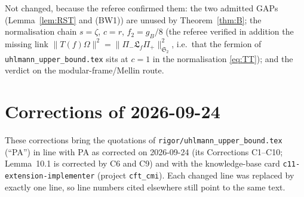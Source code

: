 \documentclass[11pt]{article}
\newcommand{\Om}{\Omega}
\newcommand{\norm}[1]{\lVert#1\rVert}
\newcommand{\gB}{g_B}
\newcommand{\Stwo}{\mathfrak S_2}
\begin{document}
Not changed, because the referee confirmed them: the two admitted GAPs (Lemma~\ref{lem:RST} and (BW1)) are
unused by Theorem~\ref{thm:B}; the normalisation chain $s=\zeta$, $c=r$, $f_2=\gB/8$ (the referee verified
in addition the missing link $\norm{T(f)\Om}^2=\norm{\Pi_-\mathfrak L_f\Pi_+}_{\Stwo}^2$, i.e.\ that the
fermion of \texttt{uhlmann\_upper\_bound.tex} sits at $c=1$ in the normalisation \eqref{eq:TT}); and the
verdict on the modular-frame/Mellin route.

\section{Corrections of 2026-09-24}\label{corr0924:sec}
\sloppy
These corrections bring the quotations of \texttt{rigor/uhlmann\_upper\_bound.tex} (``PA'') in line
with PA as corrected on 2026-09-24 (its Corrections C1--C10; Lemma~10.1 is corrected by C6 and C9) and with the knowledge-base card
\texttt{c11-extension-implementer} (project \texttt{cft\_cmi}).  Each changed line was replaced by
exactly one line, so line numbers cited elsewhere still point to the same text.
\end{document}
